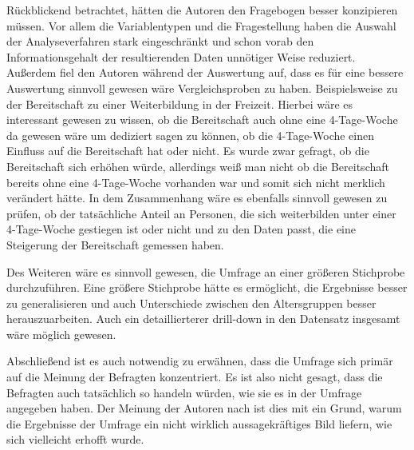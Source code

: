 Rückblickend betrachtet, hätten die Autoren den Fragebogen besser konzipieren müssen.
Vor allem die Variablentypen und die Fragestellung haben die Auswahl der Analyseverfahren stark eingeschränkt und 
schon vorab den Informationsgehalt der resultierenden Daten unnötiger Weise reduziert.
Außerdem fiel den Autoren während der Auswertung auf, dass es für eine bessere Auswertung sinnvoll gewesen wäre 
Vergleichsproben zu haben. Beispielsweise zu der Bereitschaft zu einer Weiterbildung in der Freizeit. 
Hierbei wäre es interessant gewesen zu wissen, ob die Bereitschaft auch ohne eine 4-Tage-Woche da gewesen 
wäre um dediziert sagen zu können, ob die 4-Tage-Woche einen Einfluss auf die Bereitschaft hat oder nicht.
Es wurde zwar gefragt, ob die Bereitschaft sich erhöhen würde, allerdings weiß man nicht
ob die Bereitschaft bereits ohne eine 4-Tage-Woche vorhanden war und somit sich nicht merklich verändert hätte.
In dem Zusammenhang wäre es ebenfalls sinnvoll gewesen zu prüfen, ob der tatsächliche Anteil an Personen, die sich weiterbilden
unter einer 4-Tage-Woche gestiegen ist oder nicht und zu den Daten passt, die eine Steigerung der Bereitschaft gemessen haben.

Des Weiteren wäre es sinnvoll gewesen, die Umfrage an einer größeren Stichprobe durchzuführen. Eine größere Stichprobe
hätte es ermöglicht, die Ergebnisse besser zu generalisieren und auch Unterschiede zwischen den Altersgruppen besser
herauszuarbeiten. Auch ein detaillierterer drill-down in den Datensatz insgesamt wäre möglich gewesen.

Abschließend ist es auch notwendig zu erwähnen, dass die Umfrage sich primär auf die Meinung der Befragten konzentriert.
Es ist also nicht gesagt, dass die Befragten auch tatsächlich so handeln würden, wie sie es in der Umfrage angegeben haben.
Der Meinung der Autoren nach ist dies mit ein Grund, warum die Ergebnisse der Umfrage ein nicht wirklich aussagekräftiges Bild 
liefern, wie sich vielleicht erhofft wurde.

